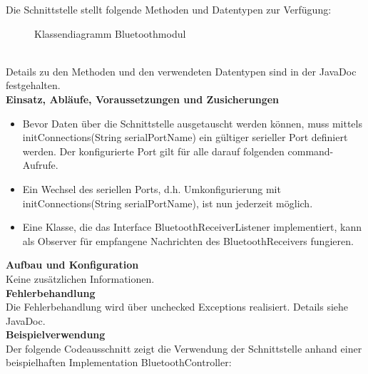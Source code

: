 Die Schnittstelle stellt folgende Methoden und Datentypen zur Verfügung:  \\
\begin{figure}[h!]          
	\centering             
	\caption{Klassendiagramm Bluetoothmodul}
	\label{fig:Klassendiagramm Bluetoothmodul}        
\end{figure} \\
Details zu den Methoden und den verwendeten Datentypen sind in der JavaDoc festgehalten. \\
\textbf{Einsatz, Abläufe, Voraussetzungen und Zusicherungen}\\
\begin{itemize}
	\item{Bevor Daten über die Schnittstelle ausgetauscht werden können, muss mittels initConnections(String serialPortName) ein gültiger serieller Port definiert werden. Der konfigurierte Port gilt für alle darauf folgenden command-Aufrufe. }
	\item{Ein Wechsel des seriellen Ports, d.h. Umkonfigurierung mit initConnections(String serialPortName), ist nun jederzeit möglich.}
	\item{Eine Klasse, die das Interface BluetoothReceiverListener implementiert, kann als Observer für empfangene Nachrichten des BluetoothReceivers fungieren.}
\end{itemize}
\textbf{Aufbau und Konfiguration} \\
Keine zusätzlichen Informationen. \\
\textbf{Fehlerbehandlung}\\
Die Fehlerbehandlung wird über unchecked Exceptions realisiert. Details siehe JavaDoc. \\
\textbf{Beispielverwendung}\\
Der folgende Codeausschnitt zeigt die Verwendung der Schnittstelle anhand einer beispielhaften Implementation BluetoothController: \\


